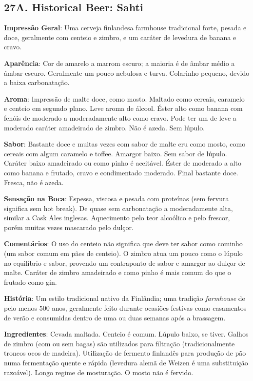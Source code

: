 \subsection*{27A. Historical Beer: Sahti}
\textbf{Impressão Geral}: Uma cerveja finlandesa farmhouse tradicional forte, pesada e doce, geralmente com centeio e zimbro, e um caráter de levedura de banana e cravo.

\textbf{Aparência}: Cor de amarelo a marrom escuro; a maioria é de âmbar médio a âmbar escuro. Geralmente um pouco nebulosa e turva. Colarinho pequeno, devido a baixa carbonatação.

\textbf{Aroma}: Impressão de malte doce, como mosto. Maltado como cereais, caramelo e centeio em segundo plano. Leve aroma de álcool. Éster alto como banana com fenóis de moderado a moderadamente alto como cravo. Pode ter um de leve a moderado caráter amadeirado de zimbro. Não é azeda. Sem lúpulo.

\textbf{Sabor}: Bastante doce e muitas vezes com sabor de malte cru como mosto, como cereais com algum caramelo e toffee. Amargor baixo. Sem sabor de lúpulo. Caráter baixo amadeirado ou como pinho é aceitável. Éster de moderado a alto como banana e frutado, cravo e condimentado moderado. Final bastante doce. Fresca, não é azeda.

\textbf{Sensação na Boca}: Espessa, viscosa e pesada com proteínas (sem fervura significa sem hot break). De quase sem carbonatação a moderadamente alta, similar a Cask Ales inglesas. Aquecimento pelo teor alcoólico e pelo frescor, porém muitas vezes mascarado pelo dulçor.

\textbf{Comentários}: O uso do centeio não significa que deve ter sabor como cominho (um sabor comum em pães de centeio). O zimbro atua um pouco como o lúpulo no equilíbrio e sabor, provendo um contraponto de sabor e amargor ao dulçor de malte. Caráter de zimbro amadeirado e como pinho é mais comum do que o frutado como gin.

\textbf{História}: Um estilo tradicional nativo da Finlândia; uma tradição \textit{farmhouse} de pelo menos 500 anos, geralmente feito durante ocasiões festivas como casamentos de verão e consumidas dentro de uma ou duas semanas após a brassagem.

\textbf{Ingredientes}: Cevada maltada. Centeio é comum. Lúpulo baixo, se tiver. Galhos de zimbro (com ou sem bagas) são utilizados para filtração (tradicionalmente troncos ocos de madeira). Utilização de fermento finlandês para produção de pão numa fermentação quente e rápida (levedura alemã de Weizen é uma substituição razoável). Longo regime de mosturação. O mosto não é fervido.


